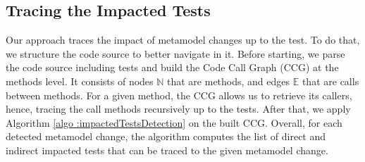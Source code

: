 \subsection{Tracing the Impacted Tests}
\label{section: tracing the impacted tests}
\red{}


Our approach traces the impact of metamodel changes up to the test. To do that, we structure the code source to better navigate in it. 
Before starting, we parse the code source including tests and build the Code Call Graph (CCG) at the methods level. It consists of nodes $\mathbb{N}$ that are methods, and edges $\mathbb{E}$ that are calls between methods. 
For a given method, the CCG allows us to retrieve its callers, hence, tracing the call methods recursively up to the tests. %
After that, we apply Algorithm \ref{algo :impactedTestsDetection} on the built CCG. Overall, for each detected metamodel change, the algorithm computes the list of direct and indirect impacted tests that can be traced to the given metamodel change. 


